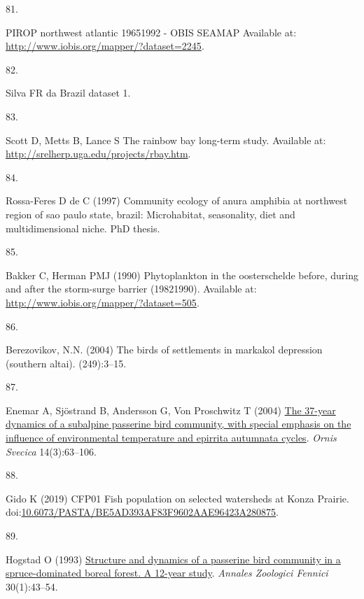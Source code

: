 \documentclass{article}
\newlength{\cslhangindent}
\newlength{\csllabelwidth}
\newlength{\cslentryspacingunit} %
\newenvironment{CSLReferences}[2] %
 {%
  \setlength{\parindent}{0pt}
  \ifodd #1
  \let\oldpar\par
  \def\par{\hangindent=\cslhangindent\oldpar}
  \fi
  \setlength{\parskip}{#2\cslentryspacingunit}
 }%
 {}
\newcommand{\CSLLeftMargin}[1]{\parbox[t]{\csllabelwidth}{#1}}
\newcommand{\CSLRightInline}[1]{\parbox[t]{\linewidth - \csllabelwidth}{#1}\break}
\begin{document}
\begin{CSLReferences}{0}{0}
\leavevmode{}%
\CSLLeftMargin{81. }%
\CSLRightInline{PIROP northwest atlantic 1965{\textendash}1992 - OBIS
SEAMAP Available at: \url{http://www.iobis.org/mapper/?dataset=2245}.}

\leavevmode{}%
\CSLLeftMargin{82. }%
\CSLRightInline{Silva FR da Brazil dataset 1.}

\leavevmode{}%
\CSLLeftMargin{83. }%
\CSLRightInline{Scott D, Metts B, Lance S The rainbow bay long-term
study. Available at: \url{http://srelherp.uga.edu/projects/rbay.htm}.}

\leavevmode{}%
\CSLLeftMargin{84. }%
\CSLRightInline{Rossa-Feres D de C (1997) Community ecology of anura
amphibia at northwest region of sao paulo state, brazil: Microhabitat,
seasonality, diet and multidimensional niche. PhD thesis.}

\leavevmode{}%
\CSLLeftMargin{85. }%
\CSLRightInline{Bakker C, Herman PMJ (1990) Phytoplankton in the
oosterschelde before, during and after the storm-surge barrier
(1982{\textendash}1990). Available at:
\url{http://www.iobis.org/mapper/?dataset=505}.}

\leavevmode{}%
\CSLLeftMargin{86. }%
\CSLRightInline{Berezovikov, N.N. (2004) The birds of settlements in
markakol depression (southern altai). (249):3--15.}

\leavevmode{}%
\CSLLeftMargin{87. }%
\CSLRightInline{Enemar A, Sjöstrand B, Andersson G, Von Proschwitz T
(2004) \href{https://doi.org/10.34080/os.v14.20236}{The 37-year dynamics
of a subalpine passerine bird community, with special emphasis on the
influence of environmental temperature and epirrita autumnata cycles}.
\emph{Ornis Svecica} 14(3):63--106.}

\leavevmode{}%
\CSLLeftMargin{88. }%
\CSLRightInline{Gido K (2019) CFP01 Fish population on selected
watersheds at Konza Prairie.
doi:\href{https://doi.org/10.6073/PASTA/BE5AD393AF83F9602AAE96423A280875}{10.6073/PASTA/BE5AD393AF83F9602AAE96423A280875}.}

\leavevmode{}%
\CSLLeftMargin{89. }%
\CSLRightInline{Hogstad O (1993)
\href{https://www.jstor.org/stable/23735355}{Structure and dynamics of a
passerine bird community in a spruce-dominated boreal forest. A 12-year
study}. \emph{Annales Zoologici Fennici} 30(1):43--54.}


\end{CSLReferences}
\end{document}
